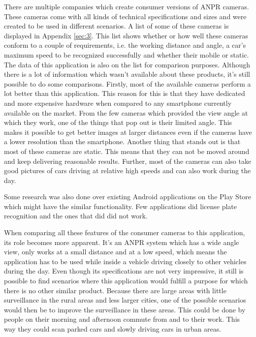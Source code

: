 
There are multiple companies which create consumer versions of ANPR cameras. These cameras come with all kinds of technical specifications and sizes and were created to be used in different scenarios. A list of some of these cameras is displayed in Appendix \ref{sec:3}. This list shows whether or how well these cameras conform to a couple of requirements, i.e. the working distance and angle, a car's maximum speed to be recognized successfully and whether their mobile or static. The data of this application is also on the list for comparison purposes. Although there is a lot of information which wasn't available about these products, it's still possible to do some comparisons. Firstly, most of the available cameras perform a lot better than this application. This reason for this is that they have dedicated and more expensive hardware when compared to any smartphone currently available on the market. From the few cameras which provided the view angle at which they work, one of the things that pop out is their limited angle. This makes it possible to get better images at larger distances even if the cameras have a lower resolution than the smartphone. Another thing that stands out is that most of these cameras are static. This means that they can not be moved around and keep delivering reasonable results. Further, most of the cameras can also take good pictures of cars driving at relative high speeds and can also work during the day.

Some research was also done over existing Android applications on the Play Store which might have the similar functionality. Few applications did license plate recognition and the ones that did did not work.


When comparing all these features of the consumer cameras to this application, its role becomes more apparent. It's an ANPR system which has a wide angle view, only works at a small distance and at a low speed, which means the application has to be used while inside a vehicle driving closely to other vehicles during the day. Even though its specifications are not very impressive, it still is possible to find scenarios where this application would fulfill a purpose for which there is no other similar product. Because there are large areas with little surveillance in the rural areas and less larger cities, one of the possible scenarios would then be to improve the surveillance in these areas. This could be done by people on their morning and afternoon commute from and to their work. This way they could scan parked cars and slowly driving cars in urban areas.